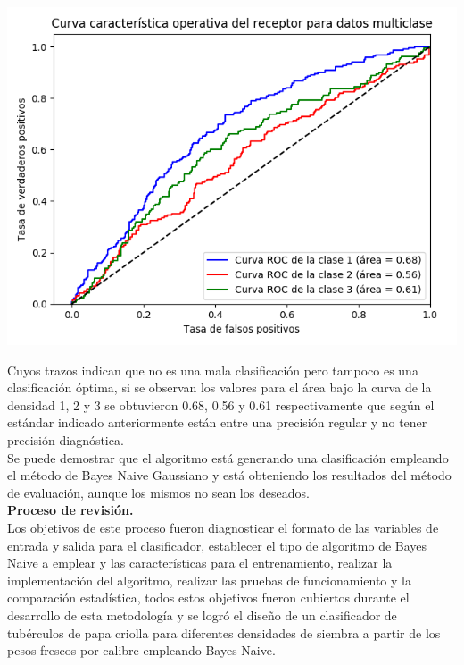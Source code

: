 \begin{center}
	\includegraphics[scale=0.6]{roc.png}
\end{center}

Cuyos trazos indican que no es una mala clasificación pero tampoco es una clasificación
óptima, si se observan los valores para el área bajo la curva de la densidad 1, 2 y 3
se obtuvieron 0.68, 0.56 y 0.61 respectivamente que según el estándar indicado anteriormente
están entre una precisión regular y no tener precisión diagnóstica.\\

Se puede demostrar que el algoritmo está generando una clasificación empleando el método de Bayes Naive Gaussiano
y está obteniendo los resultados del método de evaluación, aunque los mismos no sean los deseados.\\

\noindent
\textbf{Proceso de revisión.}\\

Los objetivos de este proceso fueron diagnosticar el formato de las
variables de entrada y salida para el clasificador, establecer el tipo de
algoritmo de Bayes Naive a emplear y las características para el entrenamiento,
realizar la implementación del algoritmo, realizar las pruebas de funcionamiento
y la comparación estadística, todos estos objetivos fueron cubiertos durante el
desarrollo de esta metodología y se logró el diseño de un clasificador de tubérculos
de papa criolla para diferentes densidades de siembra a partir de los pesos frescos
por calibre empleando Bayes Naive.\\

